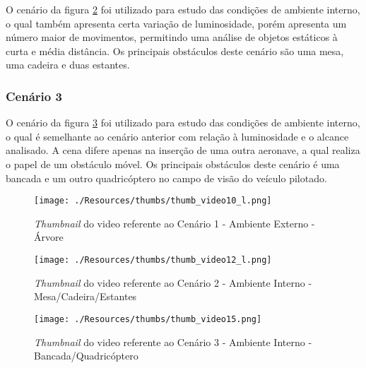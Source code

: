 O cenário da figura \ref{thumb_video12_l} foi utilizado para estudo das condições de ambiente interno, o qual também apresenta certa variação de luminosidade, porém apresenta um número maior de movimentos, permitindo uma análise de objetos estáticos à curta e média distância. Os principais obstáculos deste cenário são uma mesa, uma cadeira e duas estantes.


\subsubsection{Cenário 3}

O cenário da figura \ref{thumb_video15} foi utilizado para estudo das condições de ambiente interno, o qual é semelhante ao cenário anterior com relação à luminosidade e o alcance analisado. A cena difere apenas na inserção de uma outra aeronave, a qual realiza o papel de um obstáculo móvel. Os principais obstáculos deste cenário é uma bancada e um outro quadricóptero no campo de visão do veículo pilotado.


\begin{figure}[h]
	\centering
	\texttt{[image: ./Resources/thumbs/thumb\_video10\_l.png]}
	\caption{\textit{Thumbnail} do video referente ao Cenário 1 - Ambiente Externo - Árvore}
	\label{thumb_video10_l}
\end{figure}

\begin{figure}[h]
	\centering
	\texttt{[image: ./Resources/thumbs/thumb\_video12\_l.png]}
	\caption{\textit{Thumbnail} do video referente ao Cenário 2 - Ambiente Interno - Mesa/Cadeira/Estantes}
	\label{thumb_video12_l}
\end{figure}

\begin{figure}[H]
	\centering
	\texttt{[image: ./Resources/thumbs/thumb\_video15.png]}
	\caption{\textit{Thumbnail} do video referente ao Cenário 3 - Ambiente Interno - Bancada/Quadricóptero}
	\label{thumb_video15}
\end{figure}


